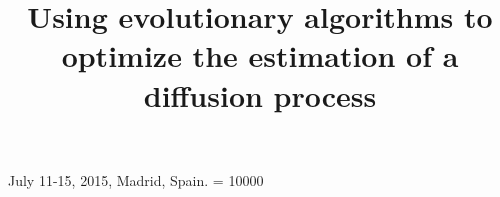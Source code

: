 \documentclass{sig-alternate}
\begin{document}
 {July 11-15, 2015, Madrid, Spain.}
    \widowpenalty = 10000
%

\title{Using evolutionary algorithms to optimize the estimation of a diffusion process}
%
%
%
%
%
\end{document}
